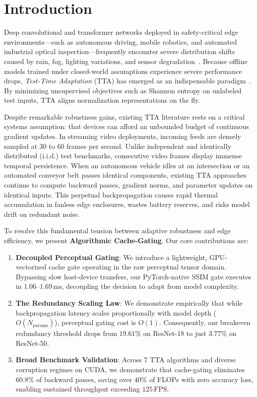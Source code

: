 \documentclass[10pt,twocolumn,letterpaper]{article}
\begin{document}
\section{Introduction}
\label{sec:intro}
Deep convolutional and transformer networks deployed in safety-critical edge environments---such as autonomous driving, mobile robotics, and automated industrial optical inspection---frequently encounter severe distribution shifts caused by rain, fog, lighting variations, and sensor degradation~\cite{hendrycks2019benchmarking}. Because offline models trained under closed-world assumptions experience severe performance drops, \textit{Test-Time Adaptation} (TTA) has emerged as an indispensable paradigm~\cite{wang2021tent}. By minimizing unsupervised objectives such as Shannon entropy on unlabeled test inputs, TTA aligns normalization representations on the fly.

Despite remarkable robustness gains, existing TTA literature rests on a critical systems assumption: that devices can afford an unbounded budget of continuous gradient updates. In streaming video deployments, incoming feeds are densely sampled at 30 to 60 frames per second. Unlike independent and identically distributed (i.i.d.) test benchmarks, consecutive video frames display immense temporal persistence. When an autonomous vehicle idles at an intersection or an automated conveyor belt passes identical components, existing TTA approaches continue to compute backward passes, gradient norms, and parameter updates on identical inputs. This perpetual backpropagation causes rapid thermal accumulation in fanless edge enclosures, wastes battery reserves, and risks model drift on redundant noise.

To resolve this fundamental tension between adaptive robustness and edge efficiency, we present \textbf{Algorithmic Cache-Gating}. Our core contributions are:
\begin{enumerate}
    \item \textbf{Decoupled Perceptual Gating}: We introduce a lightweight, GPU-vectorized cache gate operating in the raw perceptual tensor domain. Bypassing slow host-device transfers, our PyTorch-native SSIM gate executes in $1.06\text{--}1.69\,\text{ms}$, decoupling the decision to adapt from model complexity.
    \item \textbf{The Redundancy Scaling Law}: We demonstrate empirically that while backpropagation latency scales proportionally with model depth ($O(N_{\text{params}})$), perceptual gating cost is $O(1)$. Consequently, our breakeven redundancy threshold drops from $19.61\%$ on ResNet-18 to just $3.77\%$ on ResNet-50.
    \item \textbf{Broad Benchmark Validation}: Across 7 TTA algorithms and diverse corruption regimes on CUDA, we demonstrate that cache-gating eliminates $60.8\%$ of backward passes, saving over $40\%$ of FLOPs with zero accuracy loss, enabling sustained throughput exceeding $125\,\text{FPS}$.
\end{enumerate}
\end{document}
